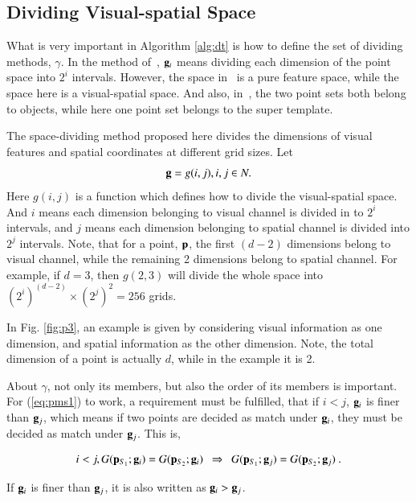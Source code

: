 \documentclass[paper]{ieice}
\begin{document}
\subsection{Dividing Visual-spatial Space}

What is very important in Algorithm \ref{alg:dt} is how to define the set of dividing methods, $\gamma$. In the method of~\cite{pmk}, ${\bf g}_i$ means dividing each dimension of the point space into $2^i$ intervals. However, the space in~\cite{pmk} is a pure feature space, while the space here is a visual-spatial space. And also, in~\cite{pmk}, the two point sets both belong to objects, while here one point set belongs to the super template.

The space-dividing method proposed here divides the dimensions of visual features and spatial coordinates at different grid sizes. Let
\[{\bf g} = g(i,j),i,j \in N.\]
Here $g(i,j)$ is a function which defines how to divide the visual-spatial space. And $i$ means each dimension belonging to visual channel is divided in to $2^i$ intervals, and $j$ means each dimension belonging to spatial channel is divided into $2^j$ intervals. Note, that for a point, $\bf p$, the first $(d-2)$ dimensions belong to visual channel, while the remaining 2 dimensions belong to spatial channel. For example, if $d=3$, then $g(2,3)$ will divide the whole space into $(2^i)^{(d-2)}\times (2^j)^2=256$ grids.

In Fig. \ref{fig:p3}, an example is given by considering visual information as one dimension, and spatial information as the other dimension. Note, the total dimension of a point is actually $d$, while in the example it is 2.

About $\gamma$, not only its members, but also the order of its members is important. For (\ref{eq:pms1}) to work, a requirement must be fulfilled, that if $i<j$, ${\bf g}_i$ is finer than ${\bf g}_j$, which means if two points are decided as match under ${\bf g}_i$, they must be decided as match under ${\bf g}_j$.  This is,



\begin{equation}
i<j, G({\bf p}_{S_1};{\bf g}_i)=G({\bf p}_{S_2};{\bf g}_i)\mbox{     }\mbox{     }\Rightarrow \mbox{     }\mbox{     }G({\bf p}_{S_1};{\bf g}_j)=G({\bf p}_{S_2};{\bf g}_j)\ .
\label{eq:pms3}
\end{equation}

If ${\bf g}_i$ is finer than ${\bf g}_j$, it is also written as ${\bf g}_i>{\bf g}_j$.
\end{document}
